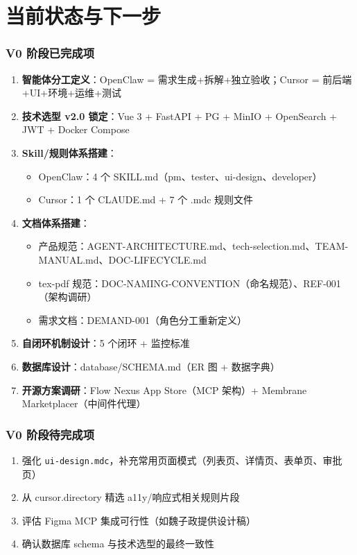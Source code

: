 \documentclass[11pt,a4paper]{article}
\begin{document}
\part{当前状态与下一步}

\section{V0 阶段已完成项}

\begin{enumerate}[nosep]
  \item \textbf{智能体分工定义}：OpenClaw = 需求生成+拆解+独立验收；Cursor = 前后端+UI+环境+运维+测试
  \item \textbf{技术选型 v2.0 锁定}：Vue 3 + FastAPI + PG + MinIO + OpenSearch + JWT + Docker Compose
  \item \textbf{Skill/规则体系搭建}：
    \begin{itemize}[nosep]
      \item OpenClaw：4 个 SKILL.md（pm、tester、ui-design、developer）
      \item Cursor：1 个 CLAUDE.md + 7 个 .mdc 规则文件
    \end{itemize}
  \item \textbf{文档体系搭建}：
    \begin{itemize}[nosep]
      \item 产品规范：AGENT-ARCHITECTURE.md、tech-selection.md、TEAM-MANUAL.md、DOC-LIFECYCLE.md
      \item tex-pdf 规范：DOC-NAMING-CONVENTION（命名规范）、REF-001（架构调研）
      \item 需求文档：DEMAND-001（角色分工重新定义）
    \end{itemize}
  \item \textbf{自闭环机制设计}：5 个闭环 + 监控标准
  \item \textbf{数据库设计}：database/SCHEMA.md（ER 图 + 数据字典）
  \item \textbf{开源方案调研}：Flow Nexus App Store（MCP 架构）+ Membrane Marketplacer（中间件代理）
\end{enumerate}

\section{V0 阶段待完成项}

\begin{enumerate}[nosep]
  \item 强化 \texttt{ui-design.mdc}，补充常用页面模式（列表页、详情页、表单页、审批页）
  \item 从 cursor.directory 精选 a11y/响应式相关规则片段
  \item 评估 Figma MCP 集成可行性（如魏子政提供设计稿）
  \item 确认数据库 schema 与技术选型的最终一致性
\end{enumerate}
\end{document}
